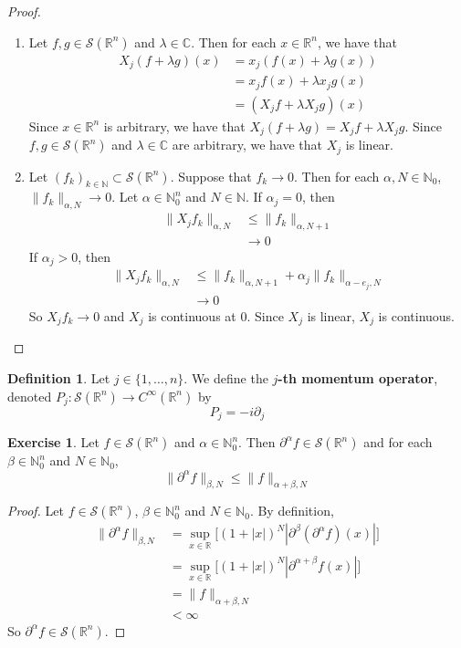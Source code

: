 \documentclass[12pt]{amsart}
\theoremstyle{definition}
\newtheorem{defn}[definition]{Definition}
\newtheorem{ex}[definition]{Exercise}
\newcommand{\p}{\partial}
\newcommand{\al}{\alpha}
\newcommand{\be}{\beta}
\newcommand{\lam}{\lambda}
\newcommand{\C}{\mathbb{C}}
\newcommand{\N}{\mathbb{N}}
\newcommand{\R}{\mathbb{R}}
\newcommand{\MS}{\mathcal{S}}
\begin{document}
	\begin{proof}\
		\begin{enumerate}
			\item Let $f, g \in \MS(\R^n)$ and $\lam \in \C$. Then for each $x \in \R^n$, we have that
			\begin{align*}
				X_j(f + \lam g)(x) 
				& = x_j(f(x) + \lam g(x)) \\
				& = x_jf(x) + \lam x_j g(x) \\
				& = (X_jf + \lam X_jg)(x)
			\end{align*} 
			Since $x \in \R^n$ is arbitrary, we have that $X_j(f + \lam g) = X_jf + \lam X_jg$. Since $f, g \in \MS(\R^n)$ and $\lam \in \C$ are arbitrary, we have that $X_j$ is linear.
			\item Let $(f_k)_{k \in \N} \subset \MS(\R^n)$. Suppose that $f_k \rightarrow 0$. Then for each $\al, N \in \N_0$, $\|f_k\|_{\al, N} \rightarrow 0$. Let $\al \in \N_0^n$ and $N \in \N$. If $\al_j = 0$, then 
			\begin{align*}
				\|X_jf_k\|_{\al, N} 
				& \leq \|f_k\|_{\al, N+1} \\
				& \rightarrow 0
			\end{align*}
			If $\al_j > 0$, then 
			\begin{align*}
				\|X_jf_k\|_{\al, N} 
				& \leq \|f_k\|_{\al, N+1} + \al_j\|f_k\|_{\al - e_j, N}\\
				& \rightarrow 0
			\end{align*}
			So $X_jf_k \rightarrow 0$ and $X_j$ is continuous at $0$. Since $X_j$ is linear, $X_j$ is continuous.
		\end{enumerate}
	\end{proof}

	\begin{defn}
		Let $j \in \{1, \ldots, n\}$. We define the \textbf{$j$-th momentum operator}, denoted $P_j: \MS(\R^n) \rightarrow C^{\infty}(\R^n)$ by 
		$$P_j = -i \p_j $$
	\end{defn}

	\begin{ex}
		Let $f \in \MS(\R^n)$ and $\al \in \N_0^n$. Then $\p^{\al}f \in \MS(\R^n)$ and for each $\be \in \N_0^n$ and $N \in \N_0$, 
		$$\|\p^{\al} f \|_{\be, N} \leq \|f \|_{\al + \be, N}$$ 
	\end{ex}
	
	\begin{proof}
		Let $f \in \MS(\R^n)$, $\be \in \N_0^n$ and $N \in \N_0$. By definition, 
		\begin{align*}
			\|\p^{\al} f \|_{\be, N}
			& = \sup_{x \in \R} \bigg[ (1 + |x|)^N |\p^{\be} (\p^{\al} f) (x)| \bigg] \\
			&= \sup_{x \in \R} \bigg[ (1 + |x|)^N |\p^{\al + \be}f (x)| \bigg] \\
			& = \|f \|_{\al + \be, N} \\
			& < \infty
		\end{align*}
		So $\p^{\al}f \in \MS(\R^n)$.
	\end{proof}
	
\end{document}
